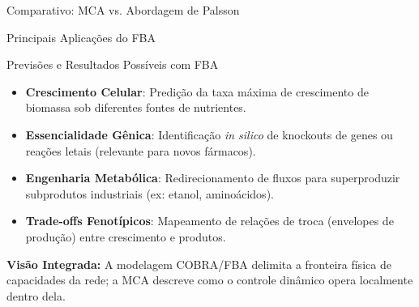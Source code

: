 \begin{frame}{Comparativo: MCA vs. Abordagem de Palsson}
\begin{table}[h]
\centering
\small
{}
\end{table}
\end{frame}

\begin{frame}[shrink=10]{Principais Aplicações do FBA}

\begin{block}{Previsões e Resultados Possíveis com FBA}
\begin{itemize}
    \item \textbf{Crescimento Celular}: Predição da taxa máxima de crescimento de biomassa sob diferentes fontes de nutrientes.
    \item \textbf{Essencialidade Gênica}: Identificação \textit{in silico} de knockouts de genes ou reações letais (relevante para novos fármacos).
    \item \textbf{Engenharia Metabólica}: Redirecionamento de fluxos para superproduzir subprodutos industriais (ex: etanol, aminoácidos).
    \item \textbf{Trade-offs Fenotípicos}: Mapeamento de relações de troca (envelopes de produção) entre crescimento e produtos.
\end{itemize}
\end{block}

\vspace{0.1cm}
\centering\small
\textcolor{azulescuro}{\textbf{Visão Integrada:} A modelagem COBRA/FBA delimita a fronteira física de capacidades da rede; a MCA descreve como o controle dinâmico opera localmente dentro dela.}
\end{frame}

